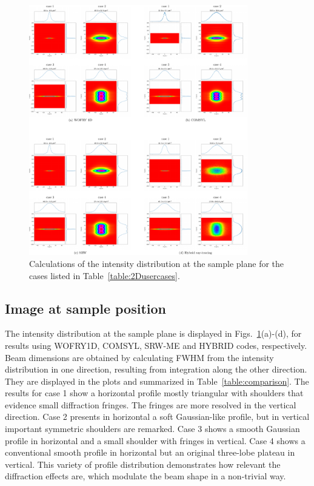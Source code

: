 \documentclass[preprint]{iucr}
\newcommand{\inred}[1]{{\color{red}#1}}
\newcommand{\whencolumns}[2]{#1}
\newcommand{\whencolumns}[2]{#2}
\begin{document}
\begin{figure}
    \label{fig:sim_results}
    \includegraphics[width=0.85\textwidth]{figures/fig_sim_results.pdf}
    \caption{Calculations of the intensity distribution at the sample plane for the cases listed in Table~\ref{table:2Dusercases}.}
\end{figure}

\whencolumns{}{\twocolumn}

\subsection{Image at sample position}

The intensity distribution at the sample plane is displayed in Figs.~\ref{fig:sim_results}(a)-(d), for results using WOFRY1D, COMSYL, SRW-ME and HYBRID codes, respectively.  Beam dimensions are obtained by calculating FWHM from the intensity distribution \inred{in} one direction, resulting from integration along the other direction. They are displayed in the plots and summarized in Table~\ref{table:comparison}.
The results for case 1 show a horizontal profile mostly triangular with shoulders that evidence small diffraction fringes. The fringes are more resolved in the vertical direction. Case 2  presents in horizontal a soft Gaussian-like profile, but in vertical important symmetric shoulders are remarked. Case 3 shows a smooth Gaussian profile in horizontal and a small shoulder with fringes in vertical. Case 4 shows a conventional smooth profile in horizontal but an original three-lobe plateau in vertical. This variety of profile distribution demonstrates how relevant the diffraction effects are, which modulate the beam shape in a non-trivial way.  
\end{document}

